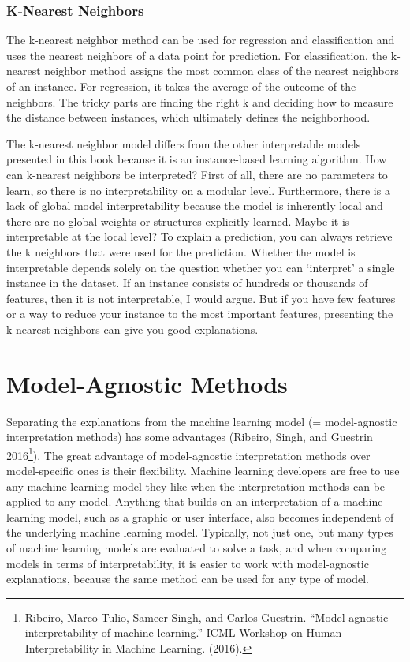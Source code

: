 \documentclass[
  12pt,
]{krantz}
\begin{document}
\hypertarget{k-nearest-neighbors}{%
\subsection{K-Nearest Neighbors}\label{k-nearest-neighbors}}

The k-nearest neighbor method can be used for regression and classification and uses the nearest neighbors of a data point for prediction.
For classification, the k-nearest neighbor method assigns the most common class of the nearest neighbors of an instance.
For regression, it takes the average of the outcome of the neighbors.
The tricky parts are finding the right k and deciding how to measure the distance between instances, which ultimately defines the neighborhood.

The k-nearest neighbor model differs from the other interpretable models presented in this book because it is an instance-based learning algorithm.
How can k-nearest neighbors be interpreted?
First of all, there are no parameters to learn, so there is no interpretability on a modular level.
Furthermore, there is a lack of global model interpretability because the model is inherently local and there are no global weights or structures explicitly learned.
Maybe it is interpretable at the local level?
To explain a prediction, you can always retrieve the k neighbors that were used for the prediction.
Whether the model is interpretable depends solely on the question whether you can `interpret' a single instance in the dataset.
If an instance consists of hundreds or thousands of features, then it is not interpretable, I would argue.
But if you have few features or a way to reduce your instance to the most important features, presenting the k-nearest neighbors can give you good explanations.

\hypertarget{agnostic}{%
\chapter{Model-Agnostic Methods}\label{agnostic}}

Separating the explanations from the machine learning model (= model-agnostic interpretation methods) has some advantages (Ribeiro, Singh, and Guestrin 2016\footnote{Ribeiro, Marco Tulio, Sameer Singh, and Carlos Guestrin. ``Model-agnostic interpretability of machine learning.'' ICML Workshop on Human Interpretability in Machine Learning. (2016).}).
The great advantage of model-agnostic interpretation methods over model-specific ones is their flexibility.
Machine learning developers are free to use any machine learning model they like when the interpretation methods can be applied to any model.
Anything that builds on an interpretation of a machine learning model, such as a graphic or user interface, also becomes independent of the underlying machine learning model.
Typically, not just one, but many types of machine learning models are evaluated to solve a task, and when comparing models in terms of interpretability, it is easier to work with model-agnostic explanations, because the same method can be used for any type of model.
\end{document}
